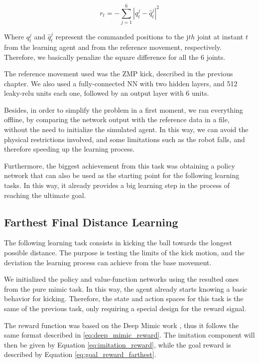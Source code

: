 \begin{equation}
r_t = -\sum_{j=1}^{6}{|q_t^j-\hat{q}_t^j|^2}
\end{equation}

Where $q_t^j$ and $\hat{q}_t^j$ represent the commanded positions to the j$th$ joint at instant $t$ from the learning agent and from the reference movement, respectively. Therefore, we basically penalize the square difference for all the 6 joints.

The reference movement used was the ZMP kick, described in the previous chapter. We also used a fully-connected NN with two hidden layers, and 512 leaky-relu units each one, followed by an output layer with 6 units.

Besides, in order to simplify the problem in a first moment, we ran everything offline, by comparing the network output with the reference data in a file, without the need to initialize the simulated agent. In this way, we can avoid the physical restrictions involved, and some limitations such as the robot falls, and therefore speeding up the learning process.

Furthermore, the biggest achievement from this task was obtaining a policy network that can also be used as the starting point for the following learning tasks. In this way, it already provides a big learning step in the process of reaching the ultimate goal.

\subsection{Farthest Final Distance Learning}

The following learning task consists in kicking the ball towards the longest possible distance. The purpose is testing the limits of the kick motion, and the deviation the learning process can achieve from the base movement.

We initialized the policy and value-function networks using the resulted ones from the pure mimic task. In this way, the agent already starts knowing a basic behavior for kicking. Therefore, the state and action spaces for this task is the same of the previous task, only requiring a special design for the reward signal.

The reward function was based on the Deep Mimic work \cite{deepmimic}, thus it follows the same format described in \eqref{eq:deep_mimic_reward}. The imitation component will then be given by Equation \eqref{eq:imitation_reward}, while the goal reward is described by Equation \eqref{eq:goal_reward_farthest}.

